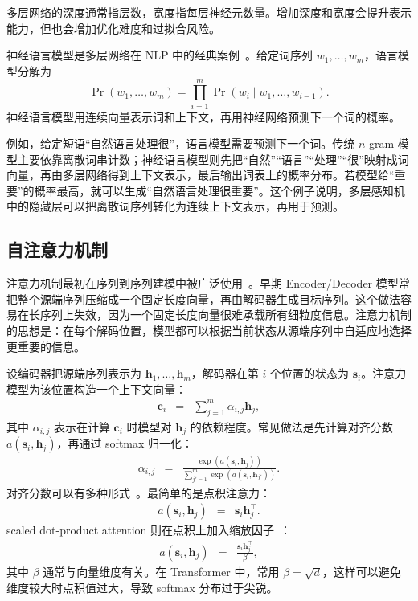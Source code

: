 多层网络的深度通常指层数，宽度指每层神经元数量。增加深度和宽度会提升表示能力，但也会增加优化难度和过拟合风险。

神经语言模型是多层网络在 NLP 中的经典案例~\cite{bengio-etal:2000neural,BengioEtAl2003NeuralLM}。给定词序列 $w_1,\ldots,w_m$，语言模型分解为
\begin{equation}
  \Pr(w_1,\ldots,w_m)
  =
  \prod_{i=1}^{m}
  \Pr(w_i\mid w_1,\ldots,w_{i-1}).
\end{equation}
神经语言模型用连续向量表示词和上下文，再用神经网络预测下一个词的概率。

例如，给定短语“自然语言处理很”，语言模型需要预测下一个词。传统 $n$-gram 模型主要依靠离散词串计数；神经语言模型则先把“自然”“语言”“处理”“很”映射成词向量，再由多层网络得到上下文表示，最后输出词表上的概率分布。若模型给“重要”的概率最高，就可以生成“自然语言处理很重要”。这个例子说明，多层感知机中的隐藏层可以把离散词序列转化为连续上下文表示，再用于预测。

\subsection{自注意力机制}

注意力机制最初在序列到序列建模中被广泛使用~\cite{BahdanauEtAl2015Attention}。早期 Encoder/Decoder 模型常把整个源端序列压缩成一个固定长度向量，再由解码器生成目标序列。这个做法容易在长序列上失效，因为一个固定长度向量很难承载所有细粒度信息。注意力机制的思想是：在每个解码位置，模型都可以根据当前状态从源端序列中自适应地选择更重要的信息。

设编码器把源端序列表示为 $\mathbf{h}_1,\ldots,\mathbf{h}_m$，解码器在第 $i$ 个位置的状态为 $\mathbf{s}_i$。注意力模型为该位置构造一个上下文向量：
\begin{eqnarray}
\mathbf{c}_i
& = &
\sum_{j=1}^{m}\alpha_{i,j}\mathbf{h}_j,
\end{eqnarray}
\noindent 其中 $\alpha_{i,j}$ 表示在计算 $\mathbf{c}_i$ 时模型对 $\mathbf{h}_j$ 的依赖程度。常见做法是先计算对齐分数 $a(\mathbf{s}_i,\mathbf{h}_j)$，再通过 softmax 归一化：
\begin{eqnarray}
\alpha_{i,j}
& = &
\frac{\exp(a(\mathbf{s}_i,\mathbf{h}_j))}
{\sum_{j'=1}^{m}\exp(a(\mathbf{s}_i,\mathbf{h}_{j'}))}.
\end{eqnarray}
对齐分数可以有多种形式~\cite{graves-etal:2014neural,luong-etal:2015effective,chaudhari-etal:2021attentive}。最简单的是点积注意力：
\begin{eqnarray}
a(\mathbf{s}_i,\mathbf{h}_j)
& = &
\mathbf{s}_i\mathbf{h}_j^\top.
\end{eqnarray}
scaled dot-product attention 则在点积上加入缩放因子~\cite{VaswaniEtAl2017Transformer}：
\begin{eqnarray}
a(\mathbf{s}_i,\mathbf{h}_j)
& = &
\frac{\mathbf{s}_i\mathbf{h}_j^\top}{\beta},
\end{eqnarray}
\noindent 其中 $\beta$ 通常与向量维度有关。在 Transformer 中，常用 $\beta=\sqrt{d}$，这样可以避免维度较大时点积值过大，导致 softmax 分布过于尖锐。

